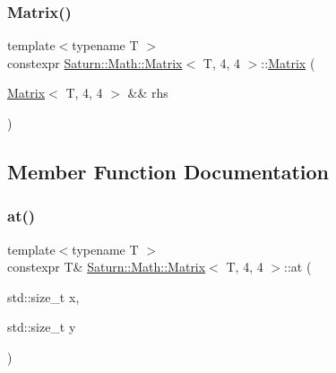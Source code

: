 \subsubsection{\texorpdfstring{Matrix()}{Matrix()}\hspace{0.1cm}{\footnotesize\ttfamily [4/4]}}
{\footnotesize\ttfamily template$<$typename T $>$ \\
constexpr \mbox{\hyperlink{class_saturn_1_1_math_1_1_matrix}{Saturn\+::\+Math\+::\+Matrix}}$<$ T, 4, 4 $>$\+::\mbox{\hyperlink{class_saturn_1_1_math_1_1_matrix}{Matrix}} (\begin{DoxyParamCaption}\item[{\mbox{\hyperlink{class_saturn_1_1_math_1_1_matrix}{Matrix}}$<$ T, 4, 4 $>$ \&\&}]{rhs }\end{DoxyParamCaption})\hspace{0.3cm}{\ttfamily [inline]}}



\subsection{Member Function Documentation}
\mbox{\label{class_saturn_1_1_math_1_1_matrix_3_01_t_00_014_00_014_01_4_aa1b90632337988e9c3b9f38ddb74e38e}} 
\subsubsection{\texorpdfstring{at()}{at()}\hspace{0.1cm}{\footnotesize\ttfamily [1/2]}}
{\footnotesize\ttfamily template$<$typename T $>$ \\
constexpr T\& \mbox{\hyperlink{class_saturn_1_1_math_1_1_matrix}{Saturn\+::\+Math\+::\+Matrix}}$<$ T, 4, 4 $>$\+::at (\begin{DoxyParamCaption}\item[{std\+::size\+\_\+t}]{x,  }\item[{std\+::size\+\_\+t}]{y }\end{DoxyParamCaption})\hspace{0.3cm}{\ttfamily [inline]}}

\mbox{\label{class_saturn_1_1_math_1_1_matrix_3_01_t_00_014_00_014_01_4_a95802964e35ca5abbe0cbe5dfcdf7469}} 
